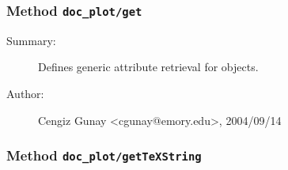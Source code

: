 \subsubsection[Method \texttt{get}]{Method \texttt{doc\_plot/get}}%
%
\label{ref_doc_plot__get}%
\hypertarget{ref_doc_plot__get}{}%
\begin{description}
\item[Summary:]Defines generic attribute retrieval for objects.
%
%
%
%
%
%
%
\item[Author:]%
Cengiz Gunay <cgunay@emory.edu>, 2004/09/14
%
\end{description}
\methodline%
\subsubsection[Method \texttt{getTeXString}]{Method \texttt{doc\_plot/getTeXString}}%
%
\label{ref_doc_plot__getTeXString}%
\hypertarget{ref_doc_plot__getTeXString}{}%
